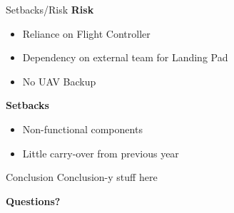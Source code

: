 \documentclass[11pt]{beamer}
\begin{document}
\begin{frame}{Setbacks/Risk}
\textbf{Risk}
\begin{itemize}
\item Reliance on Flight Controller
\item Dependency on external team for Landing Pad
\item No UAV Backup
\end{itemize}
\vspace{6mm}
\textbf{Setbacks}
\begin{itemize}
\item Non-functional components
\item Little carry-over from previous year
\end{itemize}
\end{frame}

\begin{frame}{Conclusion}
Conclusion-y stuff here
\end{frame}

\begin{frame}
\center \Large{{\textbf{Questions?}}}
\end{frame}
\end{document}

